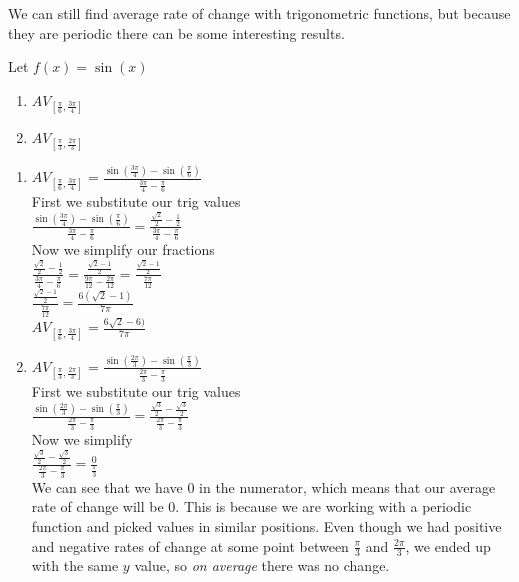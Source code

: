 \documentclass{ximera}
\begin{document}
We can still find average rate of change with trigonometric functions, but because they are periodic there can be some interesting results.

\begin{example}
Let $f(x) =\sin(x)$
\begin{enumerate}
\item $AV_{[\frac{\pi}{6},\frac{3\pi}{4}]} $
\item $AV_{[\frac{\pi}{3},\frac{2\pi}{3}]} $
\end{enumerate}
\begin{explanation}
\begin{enumerate}
\item $AV_{[\frac{\pi}{6},\frac{3\pi}{4}]}  = \frac{\sin(\frac{3\pi}{4})-\sin(\frac{\pi}{6})}{\frac{3\pi}{4} - \frac{\pi}{6}}$\\
First we substitute our trig values\\
$\frac{\sin(\frac{3\pi}{4})-\sin(\frac{\pi}{6})}{\frac{3\pi}{4} - \frac{\pi}{6}}=\frac{\frac{\sqrt{2}}{2}-\frac{1}{2}}{\frac{3\pi}{4} - \frac{\pi}{6}}$\\
Now we simplify our fractions\\
$\frac{\frac{\sqrt{2}}{2}-\frac{1}{2}}{\frac{3\pi}{4} - \frac{\pi}{6}}= \frac{\frac{\sqrt{2}-1}{2}}{\frac{9\pi}{12} - \frac{2\pi}{12}}= \frac{\frac{\sqrt{2}-1}{2}}{\frac{7\pi}{12}}$\\
$\frac{\frac{\sqrt{2}-1}{2}}{\frac{7\pi}{12}}=\frac{6(\sqrt{2}-1)}{7\pi}$\\
$AV_{[\frac{\pi}{6},\frac{3\pi}{4}]} =\frac{6\sqrt{2}-6)}{7\pi}$

\item $AV_{[\frac{\pi}{3},\frac{2\pi}{3}]} = \frac{\sin(\frac{2\pi}{3})-\sin(\frac{\pi}{3})}{\frac{2\pi}{3} - \frac{\pi}{3}}$\\
First we substitute our trig values\\
$\frac{\sin(\frac{2\pi}{3})-\sin(\frac{\pi}{3})}{\frac{2\pi}{3} - \frac{\pi}{3}} = \frac{\frac{\sqrt{3}}{2}-\frac{\sqrt{3}}{2}}{\frac{2\pi}{3} - \frac{\pi}{3}}$\\
Now we simplify\\
$\frac{\frac{\sqrt{3}}{2}-\frac{\sqrt{3}}{2}}{\frac{2\pi}{3} - \frac{\pi}{3}}=\frac{0}{\frac{\pi}{3}}$\\
We can see that we have $0$ in the numerator, which means that our average rate of change will be $0$. This is because we are working with a periodic function and picked values in similar positions. Even though we had positive and negative rates of change at some point between $\frac{\pi}{3}$ and $\frac{2\pi}{3}$, we ended up with the same $y$ value, so \textit{on average} there was no change.
\end{enumerate}
\end{explanation}
\end{example}
\end{document}
